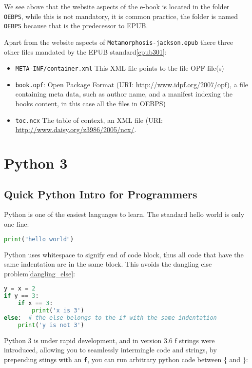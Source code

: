\documentclass[]{report}   %
\begin{document}
We see above that the website aspects of the e-book is located in the folder
\texttt{OEBPS}, while this is not mandatory, it is common practice, the folder
is named \texttt{OEBPS} because that is the predecessor to EPUB.

Apart from the website aspects of \texttt{Metamorphosis-jackson.epub} there
three other files mandated by the EPUB standard\ref{epub301}:
\begin{itemize}
    \item \texttt{META-INF/container.xml} This XML file points to the file OPF file(s)
    \item \texttt{book.opf}: Open Package Format (URI:
          \url{http://www.idpf.org/2007/opf}), a file containing meta data, such as
          author name, and a manifest indexing the books content, in this case all
          the files in OEBPS)
    \item \texttt{toc.ncx} The table of context, an XML file (URI:
          \url{http://www.daisy.org/z3986/2005/ncx/}.
\end{itemize}

\section{Python 3}
\subsection{Quick Python Intro for Programmers}
Python is one of the easiest languages to learn. The standard hello world is only one line:
\begin{lstlisting}[language=python]
print("hello world")
\end{lstlisting}

Python uses whitespace to signify end of code block, thus all code that have the same indentation are in the same block. This avoids the dangling else problem\ref{dangling_else}:

\begin{lstlisting}[language=python]
y = x = 2
if y == 3:
    if x == 3:
        print('x is 3')
else:  # the else belongs to the if with the same indentation
    print('y is not 3')
\end{lstlisting}

% 
Python 3 is under rapid development, and in version 3.6 f strings were
introduced, allowing you to seamlessly intermingle code and strings, by
prepending stings with an \textbf{\texttt{f}}, you can run arbitrary python
code between \{ and \}:
\end{document}
